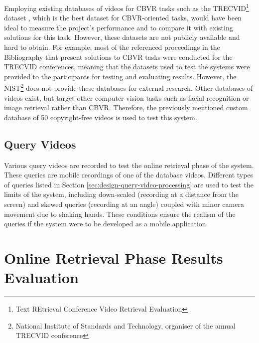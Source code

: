 Employing existing databases of videos for CBVR tasks such as the TRECVID\footnote{Text REtrieval Conference Video Retrieval Evaluation} dataset \cite{2018trecvidawad}, which is the best dataset for CBVR-oriented tasks, would have been ideal to measure the project's performance and to compare it with existing solutions for this task. However, these datasets are not publicly available and hard to obtain. For example, most of the referenced proceedings in the Bibliography that present solutions to CBVR tasks were conducted for the TRECVID conferences, meaning that the datasets used to test the systems were provided to the participants for testing and evaluating results. However, the NIST\footnote{National Institute of Standards and Technology, organiser of the annual TRECVID conference} does not provide these databases for external research. Other databases of videos exist, but target other computer vision tasks such as facial recognition or image retrieval rather than CBVR. Therefore, the previously mentioned custom database of 50 copyright-free videos is used to test this system.


\subsection{Query Videos}

Various query videos are recorded to test the online retrieval phase of the system. These queries are mobile recordings of one of the database videos. Different types of queries listed in Section \ref{sec:design-query-video-processing} are used to test the limits of the system, including down-scaled (recording at a distance from the screen) and skewed queries (recording at an angle) coupled with minor camera movement due to shaking hands. These conditions ensure the realism of the queries if the system were to be developed as a mobile application.\\


\section{Online Retrieval Phase Results Evaluation}

